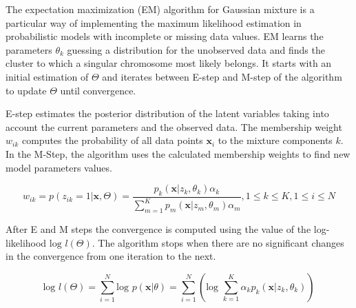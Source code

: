 \documentclass{llncs}
\renewcommand{\vec}[1]{\mathbf{#1}}
\begin{document}
\marginpar{\textcolor{blue}{Expec. Maximization}}
The expectation maximization (EM) algorithm \cite{dempster1977maximum} for Gaussian mixture is a particular way of implementing the maximum likelihood estimation in probabilistic models with incomplete or missing data values. EM learns the parameters $\theta_k$ guessing a distribution for the unobserved data and finds the cluster to which a singular chromosome  most likely belongs. It starts with an initial estimation of $\Theta$ and iterates between E-step and M-step of the algorithm to update $\Theta$ until convergence. 

E-step estimates the posterior distribution of the latent variables taking into account  the current parameters and the observed data. The membership weight $w_{ik}$ computes the probability of all data points $\vec{x}_i$ to the mixture components $k$. In the M-Step, the algorithm uses the calculated membership weights to find new model parameters values.


\begin{equation}\label{eqn:membership}
w_{ik} = p\left(z_{ik}=1|\vec{x}, \Theta\right) = \frac{p_k\left(  \vec{x}|z_k,\theta_k \right)\alpha_k}{\sum_{m=1}^{K}p_m\left(  \vec{x}|z_m,\theta_m \right)\alpha_m},  1\leq k \leq K,  1\leq i \leq N
\end{equation} 


After E and M steps the  convergence is computed using the value of the log-likelihood $\text{log } l\left(\Theta\right)$. The algorithm stops when there are no significant changes in the convergence from one iteration to the next.


\begin{equation}\label{eqn:loglike}
\text{log } l\left(\Theta\right) = \sum\limits_{i=1}^{N} \text{log } p\left(  \vec{x}|\theta \right)= \sum\limits_{i=1}^{N} \left(\text{log }\sum\limits_{k=1}^{K} \alpha_kp_k\left(  \vec{x}|z_k,\theta_k \right) \right)
\end{equation} 



 
 
 
\end{document}
